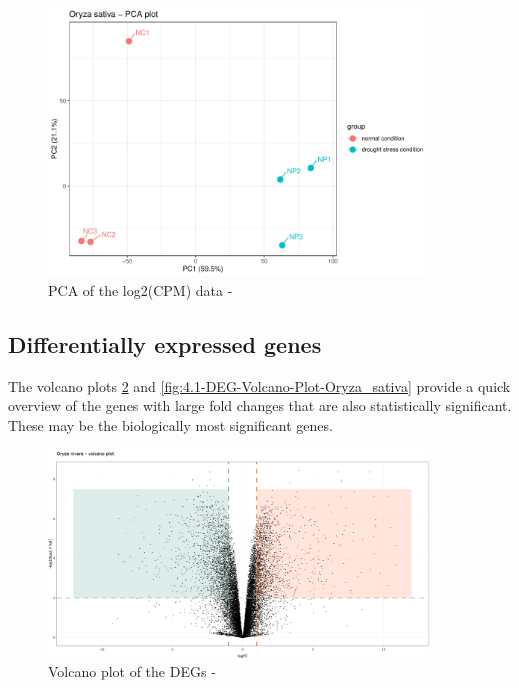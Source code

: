 \begin{figure}[htbp]
    \caption{PCA of the log2(CPM) data - }
    \label{fig:3.2-PCA-Oryza_sativa}
    \includegraphics[width=0.9\textwidth]{../../results/plots-and-tables/3.2-PCA-Oryza_sativa}
\end{figure}


\subsection{Differentially expressed genes}

The volcano plots \ref{fig:4.1-DEG-Volcano-Plot-Oryza_nivara} and \ref{fig:4.1-DEG-Volcano-Plot-Oryza_sativa} provide a quick overview of the genes with large fold changes that are also statistically significant. These may be the biologically most significant genes.

\begin{figure}[htbp]
    \caption{Volcano plot of the DEGs - }
    \label{fig:4.1-DEG-Volcano-Plot-Oryza_nivara}
    \includegraphics[width=0.9\textwidth]{../../results/plots-and-tables/4.1-DEG-Volcano-Plot-Oryza_nivara}
\end{figure}

